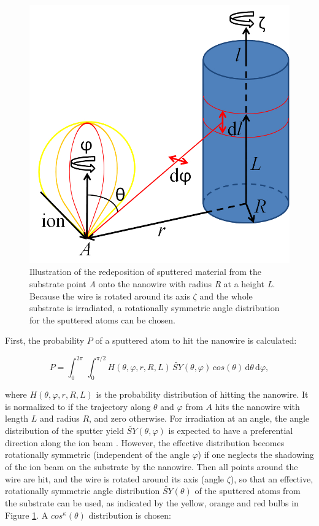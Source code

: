\begin{figure}
	\centering
		\includegraphics[width=.45\textwidth]{images/redeposit.jpg}
	\caption{Illustration of the redeposition of sputtered material from the substrate point \emph{A} onto the nanowire with radius \emph{R} at a height \emph{L}. Because the wire is rotated around its axis $\zeta$ and the whole substrate is irradiated, a rotationally symmetric angle distribution for the sputtered atoms can be chosen.} 
	\label{redeposit}
\end{figure}

First, the probability $P$ of a sputtered atom to hit the nanowire is calculated:

\begin{equation}
\label{prob1}
P = \int_0^{2\pi} \! \,\int_0^{\pi/2} \!\! H(\theta,\varphi,r,R,L) \, \tilde{SY}(\theta,\varphi) \,cos(\theta)\,\mathrm{d}\theta \, \mathrm{d}\varphi,
\end{equation}

where $H(\theta,\varphi,r,R,L)$ is the probability distribution of hitting the nanowire. It is normalized to  if the trajectory along $\theta$ and $\varphi$ from $A$ hits the nanowire with length $L$ and radius $R$, and zero otherwise. For irradiation at an angle, the angle distribution of the sputter yield $\tilde{SY}(\theta,\varphi)$ is expected to have a preferential direction along the ion beam \cite{verdeil_angular_2008}. However, the effective distribution becomes rotationally symmetric (independent of the angle $\varphi$) if one neglects the shadowing of the ion beam on the substrate by the nanowire. Then all points around the wire are hit, and the wire is rotated around its axis (angle $\zeta$), so that an effective, rotationally symmetric angle distribution $\tilde{SY}(\theta)$ of the sputtered atoms from the substrate can be used, as indicated by the yellow, orange and red bulbs in Figure \ref{redeposit}. A $cos^\kappa(\theta)$ distribution is chosen: 

